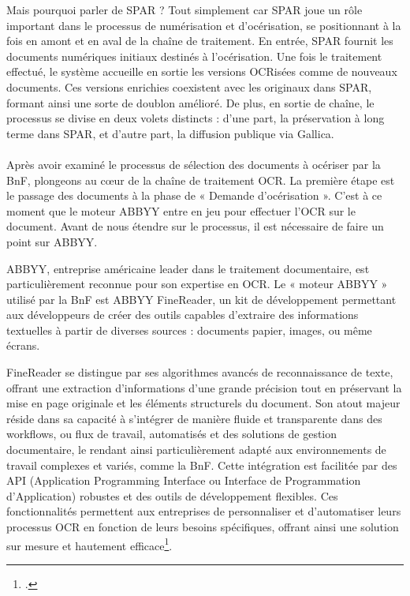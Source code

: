 \documentclass[a4paper,12pt,twoside]{book}
\begin{document}
	Mais pourquoi parler de SPAR ? Tout simplement car SPAR joue un rôle important dans le processus de numérisation et d'océrisation, se positionnant à la fois en amont et en aval de la chaîne de traitement. En entrée, SPAR fournit les documents numériques initiaux destinés à l'océrisation. Une fois le traitement effectué, le système accueille en sortie les versions OCRisées comme de nouveaux documents. Ces versions enrichies coexistent avec les originaux dans SPAR, formant ainsi une sorte de doublon amélioré. De plus, en sortie de chaîne, le processus se divise en deux volets distincts : d'une part, la préservation à long terme dans SPAR, et d'autre part, la diffusion publique via Gallica.
	\\
	\\
	
	Après avoir examiné le processus de sélection des documents à océriser par la BnF, plongeons au cœur de la chaîne de traitement OCR. La première étape est le passage des documents à la phase de « Demande d'océrisation ». C'est à ce moment que le moteur ABBYY entre en jeu pour effectuer l'OCR sur le document. Avant de nous étendre sur le processus, il est nécessaire de faire un point sur ABBYY.
	
	ABBYY, entreprise américaine leader dans le traitement documentaire, est particulièrement reconnue pour son expertise en OCR. Le « moteur ABBYY » utilisé par la BnF est ABBYY FineReader, un kit de développement permettant aux développeurs de créer des outils capables d'extraire des informations textuelles à partir de diverses sources : documents papier, images, ou même écrans.
	
	FineReader se distingue par ses algorithmes avancés de reconnaissance de texte, offrant une extraction d'informations d'une grande précision tout en préservant la mise en page originale et les éléments structurels du document. Son atout majeur réside dans sa capacité à s'intégrer de manière fluide et transparente dans des workflows, ou flux de travail, automatisés et des solutions de gestion documentaire, le rendant ainsi particulièrement adapté aux environnements de travail complexes et variés, comme la BnF. Cette intégration est facilitée par des API (Application Programming Interface ou Interface de Programmation d'Application) robustes et des outils de développement flexibles. Ces fonctionnalités permettent aux entreprises de personnaliser et d'automatiser leurs processus OCR en fonction de leurs besoins spécifiques, offrant ainsi une solution sur mesure et hautement efficace\footcite{tafti_ocr_2016}.
	\\
	
\end{document}
